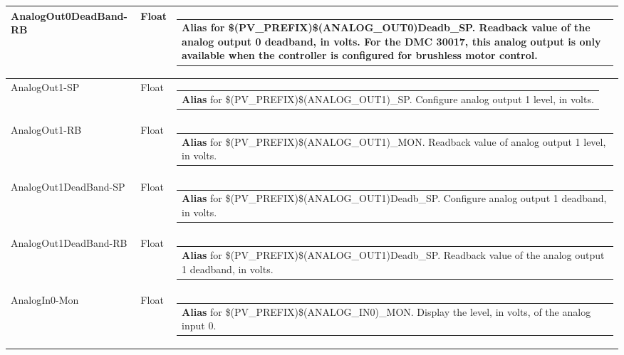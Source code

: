 \documentclass[openany]{article}
\begin{document}
\begin{longtable}{| m{4.5cm} m{2.5cm}  m{8.5cm} |}
        AnalogOut0DeadBand-RB & Float & \begin{tabular}{@{}m{6cm}@{}}
                \textbf{\color{blue} Alias} for \$(PV\_PREFIX)\$(ANALOG\_OUT0)Deadb\_SP. Readback value of the analog output 0 deadband, in volts. For the DMC 30017, this analog output is only available when the controller is configured for brushless motor control.
            \end{tabular} \hypertarget{pv:analog-out-1}{}\\ \hline
        AnalogOut1-SP & Float & \begin{tabular}{@{}m{6cm}@{}}
                \textbf{\color{blue} Alias} for \$(PV\_PREFIX)\$(ANALOG\_OUT1)\_SP. Configure analog output 1 level, in volts.
            \end{tabular} \hypertarget{}{}\\ \hline
        AnalogOut1-RB & Float & \begin{tabular}{@{}m{6cm}@{}}
                \textbf{\color{blue} Alias} for \$(PV\_PREFIX)\$(ANALOG\_OUT1)\_MON. Readback value of analog output 1 level, in volts.
            \end{tabular} \hypertarget{pv:analog-out-1-dead-band}{}\\ \hline
        AnalogOut1DeadBand-SP & Float & \begin{tabular}{@{}m{6cm}@{}}
                \textbf{\color{blue} Alias} for \$(PV\_PREFIX)\$(ANALOG\_OUT1)Deadb\_SP. Configure analog output 1 deadband, in volts.
            \end{tabular} \hypertarget{}{}\\ \hline
        AnalogOut1DeadBand-RB & Float & \begin{tabular}{@{}m{6cm}@{}}
                \textbf{\color{blue} Alias} for \$(PV\_PREFIX)\$(ANALOG\_OUT1)Deadb\_SP. Readback value of the analog output 1 deadband, in volts.
            \end{tabular} \hypertarget{pv:analog-in-0-mon}{}\\ \hline
        AnalogIn0-Mon & Float & \begin{tabular}{@{}m{6cm}@{}}
                \textbf{\color{blue} Alias} for \$(PV\_PREFIX)\$(ANALOG\_IN0)\_MON. Display the level, in volts, of the analog input 0.
            \end{tabular} \hypertarget{pv:analog-in-0-dead-band}{}\\ \hline

\end{longtable}
\end{document}
